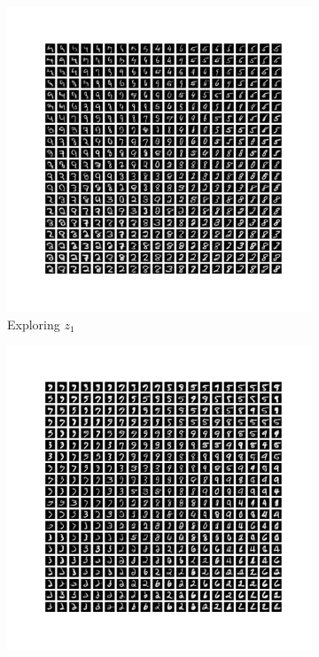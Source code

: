\documentclass[11pt]{article}
\begin{document}
    \begin{figure}[t]
        \centering
        \begin{subfigure}{0.3\textwidth}
            \centering
            \includegraphics[width=\textwidth]{images/vlae_plots1.png}
            \caption{Exploring $z_1$}
            \label{subfig:vlae_plots1}
        \end{subfigure}
        \hfill
        \begin{subfigure}{0.3\textwidth}
            \centering
            \includegraphics[width=\textwidth]{images/vlae_plots2.png}

\end{subfigure}
\end{figure}
\end{document}
